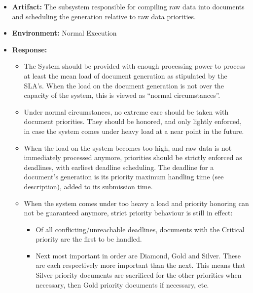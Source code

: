 \documentclass[a4paper,10pt]{article}
\begin{document}
\begin{itemize}
    \item \textbf{Artifact:} The subsystem responsible for compiling raw data into documents and scheduling the generation relative to raw data priorities.
    \item \textbf{Environment:} Normal Execution
    \item \textbf{Response:}
        \begin{itemize}
            \item The System should be provided with enough processing power to process at least the mean load of document generation as stipulated by the SLA's. When the load on the document generation is not over the capacity of the system, this is viewed as ``normal circumstances''.
            \item Under normal circumstances, no extreme care should be taken with document priorities. They should be honored, and only lightly enforced, in case the system comes under heavy load at a near point in the future.
            \item When the load on the system becomes too high, and raw data is not immediately processed anymore, priorities should be strictly enforced as deadlines, with earliest deadline scheduling. The deadline for a document's generation is its priority maximum handling time (see description), added to its submission time.
            \item When the system comes under too heavy a load and priority honoring can not be guaranteed anymore, strict priority behaviour is still in effect:
            \begin{itemize}
                \item Of all conflicting/unreachable deadlines, documents with the Critical priority are the first to be handled.
                \item Next most important in order are Diamond, Gold and Silver. These are each respectively more important than the next. This means that Silver priority documents are sacrificed for the other priorities when necessary, then Gold priority documents if necessary, etc.
            \end{itemize}
        \end{itemize}


\end{itemize}
\end{document}

